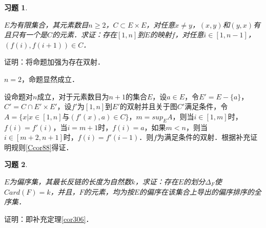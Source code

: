 \documentclass[12pt, a4paper, oneside]{book}
\newtheorem{exer}{习题}
\begin{document}
			\begin{exer}\label{exer130}
				\hfill\par
				$E$为有限集合，其元素数目$n\geq 2$，$C\subset E\times E$，对任意$x\neq y$，$(x, y)$和$(y, x)$有且只有一个是$C$的元素．求证：存在$[1, n]$到$E$的映射$f$，对任意$i\in [1, n-1]$，$(f(i), f(i+1))\in C$．
			\end{exer}
			证明：将命题加强为存在双射．
			\par
			$n=2$，命题显然成立．
			\par
			设命题对$n$成立，对于元素数目为$n+1$的集合$E$，设$a\in E$，令$E'=E-\{a\}$，$C'=C\cap E'\times E'$，设$f'$为$[1, n]$到$E'$的双射并且关于图$C'$满足条件，令$A=\{x|x\in [1, n]\text{与}(f'(x), a)\in C\}$，$m=sup_EA$，则当$i\in [1, m]$时，$f(i)=f'(i)$，当$i=m+1$时，$f(i)=a$，如果$m<n$，则当$i\in [m+2, n+1]$时，$f(i)=f'(i-1)$．则$f$为满足条件的双射．根据补充证明规则\ref{Ccor88}得证．
			
			\begin{exer}\label{exer131}
				\hfill\par
				$E$为偏序集，其最长反链的长度为自然数$k$，求证：存在$E$的划分$\Delta_F$使$Card(F)=k$，并且，$F$的元素，均为按$E$的偏序在该集合上导出的偏序排序的全序集．
			\end{exer}
			证明：即补充定理\ref{cor306}．
			
\end{document}
